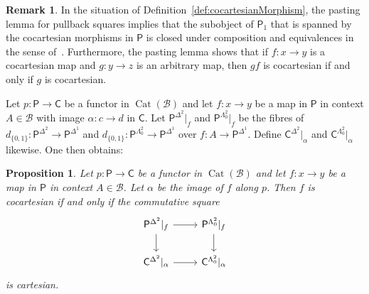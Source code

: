 \documentclass[reqno]{amsart}
\numberwithin{equation}{subsection}
\theoremstyle{plain}
\newtheorem{proposition}[equation]{Proposition}
\theoremstyle{definition}
\newtheorem{remark}[equation]{Remark}
\let\scr=\mathcal
\def\BB{\scr B}
\DeclareMathOperator{\Cat}{Cat}
\newcommand{\I}[1]{\mathsf{#1}}
\begin{document}
\begin{remark}
	\label{rem:stabilityCocartesianMaps}
	In the situation of Definition~\ref{def:cocartesianMorphism}, the pasting lemma for pullback squares implies that the subobject of $\I{P}_1$ that is spanned by the cocartesian morphisms in $\I{P}$ is closed under composition and equivalences in the sense of~\cite[Proposition~2.9.8]{Martini2021a}. Furthermore, the pasting lemma shows that if $f\colon x\to y$ is a cocartesian map and $g\colon y\to z$ is an arbitrary map, then $gf$ is cocartesian if and only if $g$ is cocartesian. 
\end{remark}

Let $p\colon \I{P}\to \I{C}$ be a functor in $\Cat(\BB)$ and let $f\colon x\to y$ be a map in $\I{P}$ in context $A\in\BB$ with image $\alpha\colon c\to d$ in $\I{C}$. Let $\I{P}^{\Delta^2}\vert_f$ and $\I{P}^{\Lambda^2_0}\vert_f$ be the fibres of $d_{\{0,1\}}\colon \I{P}^{\Delta^2}\to\I{P}^{\Delta^1}$ and $d_{\{0,1\}}\colon \I{P}^{\Lambda^2_0}\to\I{P}^{\Delta^1}$ over $f\colon A\to \I{P}^{\Delta^1}$. Define $\I{C}^{\Delta^2}\vert_\alpha$ and $\I{C}^{\Lambda^2_0}\vert_\alpha$ likewise. One then obtains:
\begin{proposition}
	\label{prop:characterisationCocartesianMorphismLifting}
	Let $p\colon \I{P}\to \I{C}$ be a functor in $\Cat(\BB)$ and let $f\colon x\to y$ be a map in $\I{P}$ in context $A\in\BB$. Let $\alpha$ be the image of $f$ along $p$. Then $f$ is cocartesian if and only if the commutative square
	\begin{equation*}
	\begin{tikzcd}
	\I{P}^{\Delta^2}\vert_f\arrow[r]\arrow[d] & \I{P}^{\Lambda^2_0}\vert_f\arrow[d]\\
	\I{C}^{\Delta^2}\vert_{\alpha}\arrow[r] & \I{C}^{\Lambda^2_0}\vert_{\alpha}
	\end{tikzcd}
	\end{equation*}
	is cartesian.
\end{proposition}
\end{document}

